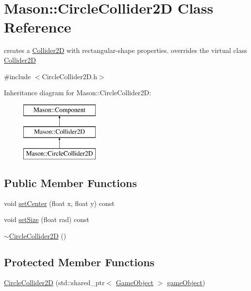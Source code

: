 \hypertarget{class_mason_1_1_circle_collider2_d}{}\section{Mason\+:\+:Circle\+Collider2D Class Reference}
\label{class_mason_1_1_circle_collider2_d}


creates a \hyperlink{class_mason_1_1_collider2_d}{Collider2D} with rectangular-\/shape properties. overrides the virtual class \hyperlink{class_mason_1_1_collider2_d}{Collider2D}  




{\ttfamily \#include $<$Circle\+Collider2\+D.\+h$>$}

Inheritance diagram for Mason\+:\+:Circle\+Collider2D\+:\begin{figure}[H]
\begin{center}
\leavevmode
\includegraphics[height=3.000000cm]{class_mason_1_1_circle_collider2_d}
\end{center}
\end{figure}
\subsection*{Public Member Functions}
\begin{DoxyCompactItemize}
\item 
void \hyperlink{class_mason_1_1_circle_collider2_d_a2b0eb06e04c150ed9e7387e0d0bff461}{set\+Center} (float x, float y) const
\item 
void \hyperlink{class_mason_1_1_circle_collider2_d_a309b612480b52a4ee538d70e79f447cb}{set\+Size} (float rad) const
\item 
\hyperlink{class_mason_1_1_circle_collider2_d_a18a73d32bc87cd999d17c5f080afae13}{$\sim$\+Circle\+Collider2D} ()
\end{DoxyCompactItemize}
\subsection*{Protected Member Functions}
\begin{DoxyCompactItemize}
\item 
\hyperlink{class_mason_1_1_circle_collider2_d_a58075e2786326b5136240a1dde186dee}{Circle\+Collider2D} (std\+::shared\+\_\+ptr$<$ \hyperlink{class_mason_1_1_game_object}{Game\+Object} $>$ \hyperlink{class_mason_1_1_component_abaa67b569d0a70e26a4606f4a099a925}{game\+Object})
\end{DoxyCompactItemize}
